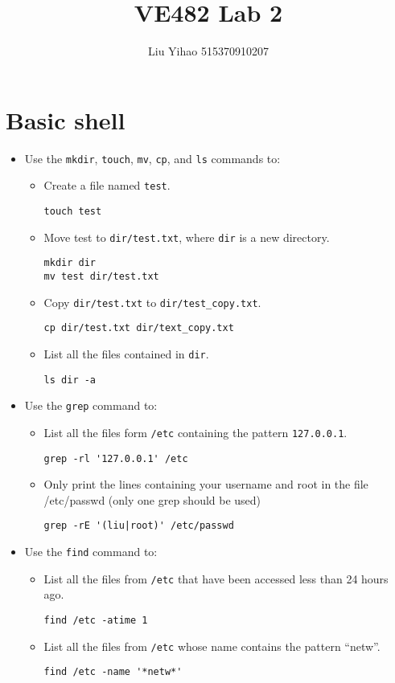 \documentclass{article}
\title{VE482 Lab 2}
\author{Liu Yihao 515370910207}
\date{}
\begin{document}
\maketitle

\section{Basic shell}
\begin{itemize}
\item Use the \texttt{mkdir}, \texttt{touch}, \texttt{mv}, \texttt{cp}, and \texttt{ls} commands to:
\begin{itemize}
\item Create a file named \texttt{test}.
\begin{verbatim}
touch test
\end{verbatim}
\item Move test to \texttt{dir/test.txt}, where \texttt{dir} is a new directory.
\begin{verbatim}
mkdir dir
mv test dir/test.txt
\end{verbatim}
\item Copy \texttt{dir/test.txt} to \texttt{dir/test_copy.txt}.
\begin{verbatim}
cp dir/test.txt dir/text_copy.txt
\end{verbatim}
\item List all the files contained in \texttt{dir}.
\begin{verbatim}
ls dir -a
\end{verbatim}
\end{itemize}

\item Use the \texttt{grep} command to:
\begin{itemize}
\item List all the files form \texttt{/etc} containing the pattern \texttt{127.0.0.1}.
\begin{verbatim}
grep -rl '127.0.0.1' /etc
\end{verbatim}
\item Only print the lines containing your username and root in the file /etc/passwd (only one grep should be used)
\begin{verbatim}
grep -rE '(liu|root)' /etc/passwd
\end{verbatim}
\end{itemize}

\item Use the \texttt{find} command to:
\begin{itemize}
\item List all the files from \texttt{/etc} that have been accessed less than 24 hours ago.
\begin{verbatim}
find /etc -atime 1
\end{verbatim}
\item List all the files from \texttt{/etc} whose name contains the pattern ``netw''.
\begin{verbatim}
find /etc -name '*netw*'
\end{verbatim}
\end{itemize}


\end{itemize}
\end{document}
